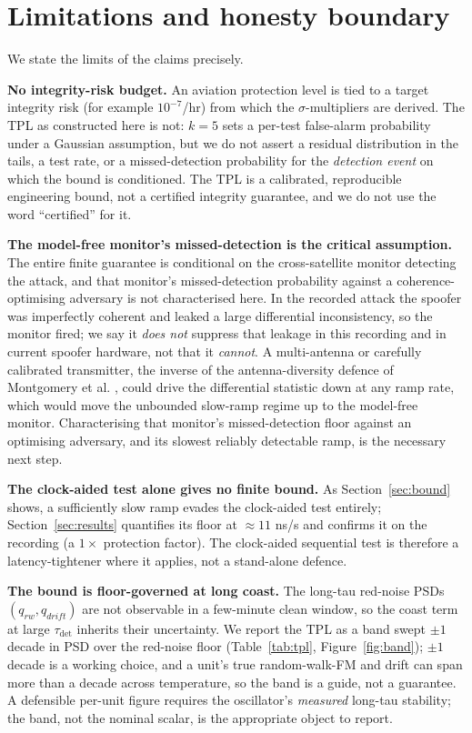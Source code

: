\documentclass[conference]{IEEEtran}
\begin{document}
\section{Limitations and honesty boundary}
\label{sec:honesty}
We state the limits of the claims precisely.

\textbf{No integrity-risk budget.} An aviation protection level is tied to a target
integrity risk (for example $10^{-7}$/hr) from which the $\sigma$-multipliers are
derived. The TPL as constructed here is not: $k=5$ sets a per-test false-alarm
probability under a Gaussian assumption, but we do not assert a residual
distribution in the tails, a test rate, or a missed-detection probability for the
\emph{detection event} on which the bound is conditioned. The TPL is a calibrated,
reproducible engineering bound, not a certified integrity guarantee, and we do not
use the word ``certified'' for it.

\textbf{The model-free monitor's missed-detection is the critical assumption.}
The entire finite guarantee is conditional on the cross-satellite monitor detecting
the attack, and that monitor's missed-detection probability against a
coherence-optimising adversary is not characterised here. In the recorded attack the
spoofer was imperfectly coherent and leaked a large differential inconsistency, so
the monitor fired; we say it \emph{does not} suppress that leakage in this recording
and in current spoofer hardware, not that it \emph{cannot}. A multi-antenna or
carefully calibrated transmitter, the inverse of the antenna-diversity defence of
Montgomery et al. \cite{montgomery}, could drive the differential statistic down at
any ramp rate, which would move the unbounded slow-ramp regime up to the model-free
monitor. Characterising that monitor's missed-detection floor against an optimising
adversary, and its slowest reliably detectable ramp, is the necessary next step.

\textbf{The clock-aided test alone gives no finite bound.} As Section~\ref{sec:bound}
shows, a sufficiently slow ramp evades the clock-aided test entirely;
Section~\ref{sec:results} quantifies its floor at $\approx 11$ ns/s and confirms it
on the recording (a $1\times$ protection factor). The clock-aided sequential test
is therefore a latency-tightener where it applies, not a stand-alone defence.

\textbf{The bound is floor-governed at long coast.} The long-tau red-noise PSDs
$(q_{rw}, q_{drift})$ are not observable in a few-minute clean window, so the coast
term at large $\tau_{\mathrm{det}}$ inherits their uncertainty. We report the TPL as
a band swept $\pm1$ decade in PSD over the red-noise floor (Table~\ref{tab:tpl},
Figure~\ref{fig:band}); $\pm1$ decade is a working choice, and a unit's true
random-walk-FM and drift can span more than a decade across temperature, so the
band is a guide, not a guarantee. A defensible per-unit figure requires the
oscillator's \emph{measured} long-tau stability; the band, not the nominal scalar,
is the appropriate object to report.
\end{document}
